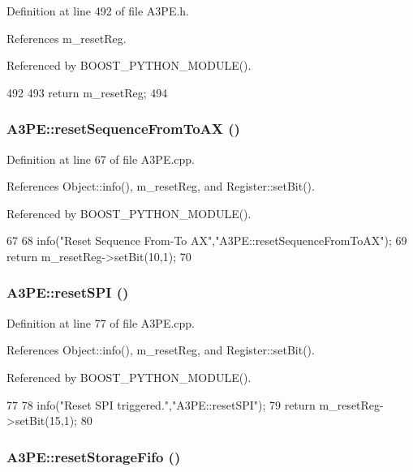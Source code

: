 Definition at line 492 of file A3PE.h.

References m\_\-resetReg.

Referenced by BOOST\_\-PYTHON\_\-MODULE().


\begin{DoxyCode}
492                       {
493     return m_resetReg;
494   }
\end{DoxyCode}
\hypertarget{classA3PE_a6015ba83a7b828efb1969291ab740eee}{
\subsubsection[{resetSequenceFromToAX}]{ A3PE::resetSequenceFromToAX ()}}
\label{classA3PE_a6015ba83a7b828efb1969291ab740eee}


Definition at line 67 of file A3PE.cpp.

References Object::info(), m\_\-resetReg, and Register::setBit().

Referenced by BOOST\_\-PYTHON\_\-MODULE().


\begin{DoxyCode}
67                                       {
68   info("Reset Sequence From-To AX","A3PE::resetSequenceFromToAX");
69   return m_resetReg->setBit(10,1);
70 }
\end{DoxyCode}
\hypertarget{classA3PE_ae164123b49f8c4d1d119dbf201f0a839}{
\subsubsection[{resetSPI}]{ A3PE::resetSPI ()}}
\label{classA3PE_ae164123b49f8c4d1d119dbf201f0a839}


Definition at line 77 of file A3PE.cpp.

References Object::info(), m\_\-resetReg, and Register::setBit().

Referenced by BOOST\_\-PYTHON\_\-MODULE().


\begin{DoxyCode}
77                          {
78   info("Reset SPI triggered.","A3PE::resetSPI");
79   return m_resetReg->setBit(15,1);
80 }
\end{DoxyCode}
\hypertarget{classA3PE_a8e7074703227b118aa9230258f22b44c}{
\subsubsection[{resetStorageFifo}]{ A3PE::resetStorageFifo ()}}
\label{classA3PE_a8e7074703227b118aa9230258f22b44c}


